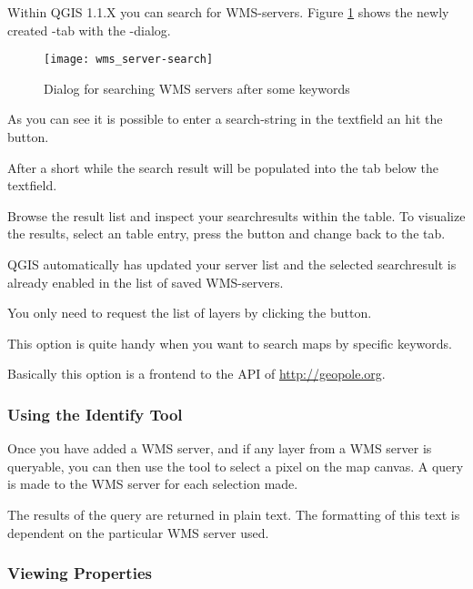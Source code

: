 Within QGIS 1.1.X you can search for WMS-servers. 
Figure \ref{fig:searchtab} shows the newly created -tab with
the -dialog.

\begin{figure}[ht]
  \begin{center}
  	\caption{Dialog for searching WMS servers after some keywords \nixcaption}\label{fig:searchtab}
	\texttt{[image: wms\_server-search]}
  \end{center}
\end{figure}

As you can see it is possible to enter a search-string in the textfield an
hit the  button.

After a short while the search result will be populated into the tab below
the textfield. 

Browse the result list and inspect your searchresults within the table. To
visualize the results, select an table entry, press the  button and change back to the  tab.

QGIS automatically has updated your server list and the selected
searchresult is already enabled in the list of saved WMS-servers.

You only need to request the list of layers by clicking the
 button.

This option is quite handy when you want to search maps by specific
keywords.

Basically this option is a frontend to the API of
\url{http://geopole.org}.

\subsubsection{Using the Identify Tool}\label{sec:ogc-wms-identify}

Once you have added a WMS server, 
and if any layer from a WMS server is queryable, you can then use
the  tool to select a pixel on the map canvas.
A query is made to the WMS server for each selection made.

The results of the query are returned in plain text.
The formatting of this text is dependent on the particular
WMS server used.

\subsubsection{Viewing Properties}\label{sec:ogc-wms-properties}

